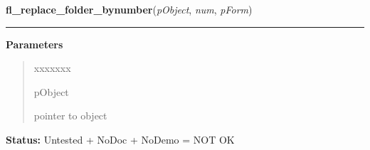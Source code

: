 \hspace{.8\funcindent}\begin{boxedminipage}{\funcwidth}

    \raggedright \textbf{fl\_replace\_folder\_bynumber}(\textit{pObject}, \textit{num}, \textit{pForm})

    \vspace{-1.5ex}

    \rule{\textwidth}{0.5\fboxrule}
\setlength{\parskip}{2ex}
\setlength{\parskip}{1ex}
      \textbf{Parameters}
      \vspace{-1ex}

      \begin{quote}
        \begin{Ventry}{xxxxxxx}

          \item[pObject]

          pointer to object

        \end{Ventry}

      \end{quote}

\textbf{Status:} Untested + NoDoc + NoDemo = NOT OK



    \end{boxedminipage}

    \label{xformslib:library:fl_set_tabfolder_autofit}

    \vspace{0.5ex}

